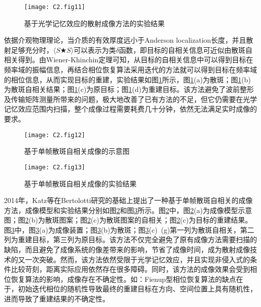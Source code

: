 \begin{figure}[htp]
	\centering
	\texttt{[image: C2.fig11]}
	\caption{基于光学记忆效应的散射成像方法的实验结果\cite{bertolotti_non-invasive_2012}}
	\label{fig2:11}
\end{figure}

依据介观物理理论\cite{akkermans_mesoscopic_2007,goodman_speckle_2007}，当介质的有效厚度远小于Anderson localization长度，并且散射足够充分时，$\langle S\bigstar S \rangle$可以表示为类$\delta$函数\cite{bertolotti_non-invasive_2012}，即目标的自相关信息可近似由散斑自相关得到。由Wiener-Khinchin定理可知，从目标的自相关信息中可以得到目标在频率域的振幅信息，再结合相位恢复算法采用迭代的方法就可以得到目标在频率域的相位信息，从而实现目标的重建，实验结果如图\ref{fig2:11}所示，图\ref{fig2:11}(a)为散斑；图\ref{fig2:11}(b)为散斑自相关结果；图\ref{fig2:11}(c)为原目标；图\ref{fig2:11}(d)为重建目标。该方法避免了波前整形及传输矩阵测量所带来的问题，极大地改善了已有方法的不足，但它仍需要在光学记忆效应范围内扫描，整个成像过程需要耗费几十分钟，依然无法满足实时成像的要求。


\begin{figure}[htp]
	\centering
	\texttt{[image: C2.fig12]}
	\caption{基于单帧散斑自相关成像的示意图\cite{katz_non-invasive_2014}}
	\label{fig2:12}
\end{figure}
\begin{figure}[htp]
	\centering
	\texttt{[image: C2.fig13]}
	\caption{基于单帧散斑自相关成像的实验结果\cite{katz_non-invasive_2014}}
	\label{fig2:13}
\end{figure}
2014年，Katz等\cite{katz_non-invasive_2014}在Bertolotti研究的基础上提出了一种基于单帧散斑自相关的成像方法，成像模型和实验结果分别如图\ref{fig2:12}和图\ref{fig2:13}所示。图\ref{fig2:12}中，图\ref{fig2:12}(a)为成像模型示意图；图\ref{fig2:12}(b)为散斑图案；图\ref{fig2:12}(c)为散斑图案的自相关；图\ref{fig2:12}(c)为目标的重建结果。图\ref{fig2:13}中，图\ref{fig2:13}(a)为成像装置；图\ref{fig2:13}(b)为散斑；图\ref{fig2:13}(c)~(g)第一列为散斑自相关，第二列为重建目标，第三列为原目标。该方法不仅完全避免了原有成像方法需要扫描的缺陷，而且避免了成像系统的像差带来的影响，节省了成像时间，成为散射成像技术的又一次突破。然而，该方法依然受限于光学记忆效应，并且实现非侵入式的条件比较苛刻，距离实际应用依然存在很多障碍。同时，该方法的成像效果会受到相位恢复算法的影响，成像存在不确定性。如：Fienup型相位恢复算法\cite{fienup_phase_1982,fienup_reconstruction_1978}的缺点在于，初始迭代相位的随机性导致最终的重建目标在方向、空间位置上具有随机性，进而导致了重建结果的不确定性。

